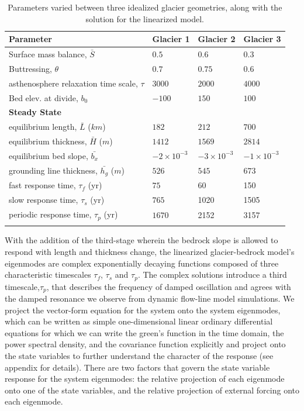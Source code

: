 \documentclass[tc, manuscript]{copernicus}
\begin{document}
\begin{table}[h]
    \begin{tabular}{llll}
        \hline
        \bf{Parameter} & \bf{Glacier 1} & \bf{Glacier 2} & \bf{Glacier 3} \\
        \hline
        Surface mass balance, $\bar{S}$ & $0.5$ & $0.6$ & $0.3$ \\
        Buttressing, $\theta$ & $0.7$ &  $0.75$ & $0.6$ \\
        asthenosphere relaxation time scale, $\tau$ & $3000$ & $2000$ & $4000$ \\
        Bed elev. at divide, $b_0$ & $-100$ & $150$ & $100$  \\
        \hline
        \bf{Steady State} \\
        \hline
        equilibrium length, $\bar{L}$ ($km$) &  $182$  & $212$ & $700$ \\
        equilibrium thickness, $\bar{H}$ ($m$) & $1412$ & $1569$ & $2814$ \\
         equilibrium bed slope, $\bar{b_x}$ & $-2 \times 10^{-3}$ & $-3 \times 10^{-3}$ & $-1 \times 10^{-3}$ \\
        grounding line thickness, $\bar{h_g}$ ($m$) & $526$ & $545$ & $673$ \\
        fast response time, $\tau_f$ (yr) & $75$ & 60 & 150 \\
        slow response time, $\tau_s$ (yr) & $765$ & 1020 & 1505 \\
        periodic response time, $\tau_p$ (yr) & $1670$ & 2152 & 3157 \\
        \hline
        \\
        
    \end{tabular}
    
    \caption{Parameters varied between three idealized glacier geometries, along with the solution for the linearized model.}
\end{table}

With the addition of the third-stage wherein the bedrock slope is allowed to respond with length and thickness change, the linearized glacier-bedrock model's eigenmodes are complex exponentially decaying functions composed of three characteristic timescales $\tau_f$, $\tau_s$ and $\tau_p$.
The complex solutions introduce a third timescale,$\tau_p$, that describes the frequency of damped oscillation and agrees with the damped resonance we observe from dynamic flow-line model simulations. We project the vector-form equation for the system onto the system eigenmodes, which can be written as simple one-dimensional linear ordinary differential equations for which we can write the green's function in the time domain, the power spectral density, and the covariance function explicitly and project onto the state variables to further understand the character of the response (see appendix for details). There are two factors that govern the state variable response for the system eigenmodes: the relative projection of each eigenmode onto one of the state variables, and the relative projection of external forcing onto each eigenmode.
\end{document}
